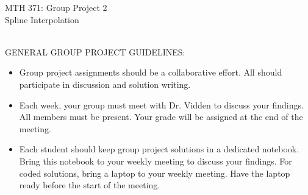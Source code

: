 \documentclass[addpoints, 11pt]{exam}
\begin{document}
\vspace{100mm}
\begin{center} \Large
MTH 371: Group Project 2 \\ Spline Interpolation \normalsize
\end{center}
\ \\
\noindent GENERAL GROUP PROJECT GUIDELINES: 
\begin{itemize}
\item Group project assignments should be a collaborative effort. All should participate in discussion and solution writing. \vspace{-2mm}
\item Each week, your group must meet with Dr. Vidden to discuss your findings. All members must be present. Your grade will be assigned at the end of the meeting. \vspace{-2mm}
\item Each student should keep group project solutions in a dedicated notebook. Bring this notebook to your weekly meeting to discuss your findings. For coded solutions, bring a laptop to your weekly meeting. Have the laptop ready before the start of the meeting. \vspace{-2mm}
\end{itemize}
\ \\
\end{document}
